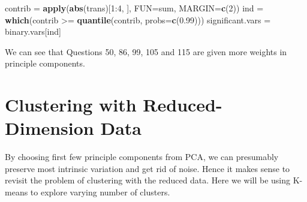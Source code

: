 \documentclass[]{article}
\newenvironment{Shaded}{\begin{snugshade}}{\end{snugshade}}
\newcommand{\KeywordTok}[1]{\textcolor[rgb]{0.13,0.29,0.53}{\textbf{{#1}}}}
\newcommand{\DataTypeTok}[1]{\textcolor[rgb]{0.13,0.29,0.53}{{#1}}}
\newcommand{\DecValTok}[1]{\textcolor[rgb]{0.00,0.00,0.81}{{#1}}}
\newcommand{\FloatTok}[1]{\textcolor[rgb]{0.00,0.00,0.81}{{#1}}}
\newcommand{\StringTok}[1]{\textcolor[rgb]{0.31,0.60,0.02}{{#1}}}
\newcommand{\NormalTok}[1]{{#1}}
\begin{document}
\begin{Shaded}
\begin{Highlighting}[]
\NormalTok{contrib =}\StringTok{ }\KeywordTok{apply}\NormalTok{(}\KeywordTok{abs}\NormalTok{(trans)[}\DecValTok{1}\NormalTok{:}\DecValTok{4}\NormalTok{, ], }\DataTypeTok{FUN=}\NormalTok{sum, }\DataTypeTok{MARGIN=}\KeywordTok{c}\NormalTok{(}\DecValTok{2}\NormalTok{))}
\NormalTok{ind =}\StringTok{ }\KeywordTok{which}\NormalTok{(contrib >=}\StringTok{ }\KeywordTok{quantile}\NormalTok{(contrib, }\DataTypeTok{probs=}\KeywordTok{c}\NormalTok{(}\FloatTok{0.99}\NormalTok{)))}
\NormalTok{significant.vars =}\StringTok{ }\NormalTok{binary.vars[ind]}
\end{Highlighting}
\end{Shaded}

We can see that Questions 50, 86, 99, 105 and 115 are given more weights
in principle components.

\section{Clustering with Reduced-Dimension
Data}\label{clustering-with-reduced-dimension-data}

By choosing first few principle components from PCA, we can presumably
preserve most intrinsic variation and get rid of noise. Hence it makes
sense to revisit the problem of clustering with the reduced data. Here
we will be using K-means to explore varying number of clusters.
\end{document}
